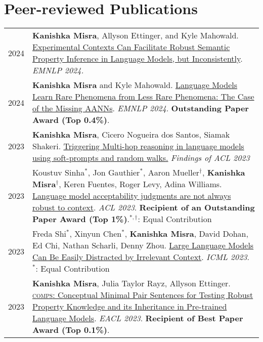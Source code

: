 \documentclass[11pt]{article}
\begin{document}
\section*{Peer-reviewed Publications}
\vspace{-1.5em}
\renewcommand*{\arraystretch}{1.5}
\begin{longtable}{p{}  p{} }

2024 & \textbf{Kanishka Misra}, Allyson Ettinger, and Kyle Mahowald. \href{https://arxiv.org/abs/2401.06640v1}{Experimental Contexts Can Facilitate Robust Semantic Property Inference in Language Models, but Inconsistently}. \textit{EMNLP 2024.}\\

2024 & \textbf{Kanishka Misra} and Kyle Mahowald. \href{https://arxiv.org/abs/2403.19827}{Language Models Learn Rare Phenomena from Less Rare Phenomena: The Case of the Missing AANNs}. \textit{EMNLP 2024}. \textcolor{award}{\textbf{Outstanding Paper Award (Top 0.4\%)}}.\\

2023 & \textbf{Kanishka Misra}, Cicero Nogueira dos Santos, Siamak Shakeri. \href{https://aclanthology.org/2023.findings-acl.62/}{Triggering Multi-hop reasoning in language models using soft-prompts and random walks.} \textit{Findings of ACL 2023}\\

2023 & Koustuv Sinha$^{*}$, Jon Gauthier$^{*}$, Aaron Mueller$^{\dagger}$, \textbf{Kanishka Misra}$^{\dagger}$, Keren Fuentes, Roger Levy, Adina Williams. \href{https://aclanthology.org/2023.acl-long.333/}{Language model acceptability judgments are not always robust to context}. \textit{ACL 2023}. \textcolor{award}{\textbf{Recipient of an Outstanding Paper Award (Top 1\%)}}.$^{*,\dagger}$: Equal Contribution\\

2023 & Freda Shi$^{*}$, Xinyun Chen$^{*}$, \textbf{Kanishka Misra}, David Dohan, Ed Chi, Nathan Scharli, Denny Zhou. \href{https://proceedings.mlr.press/v202/shi23a.html}{Large Language Models Can Be Easily Distracted by Irrelevant Context}. \textit{ICML 2023}. $^{*}$: Equal Contribution\\

2023 & \textbf{Kanishka Misra}, Julia Taylor Rayz, Allyson Ettinger. \href{https://aclanthology.org/2023.eacl-main.213}{\textsc{comps}: Conceptual Minimal Pair Sentences for Testing Robust Property Knowledge and its Inheritance in Pre-trained Language Models}. \textit{EACL 2023}. \textbf{\textcolor{award}{Recipient of Best Paper Award (Top 0.1\%)}}.\\


\end{longtable}
\end{document}

